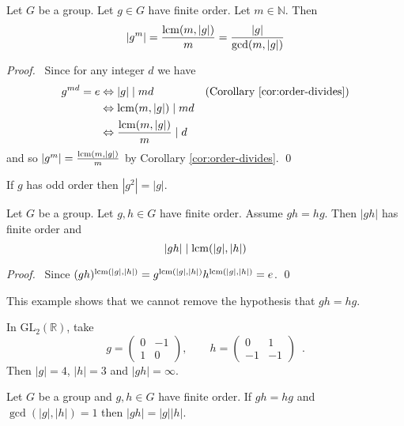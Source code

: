 \begin{prop}
\label{prop:order-of-g-to-the-m}
    Let $G$ be a group. Let $g \in G$ have finite order. Let $m \in \mathbb{N}$. Then
    \[ |g^m| = \frac{\operatorname{lcm}(m,|g|)}{m} = \frac{|g|}{\gcd(m,|g|)}\]
\end{prop}

\begin{proof}
    \pf\ Since for any integer $d$ we have
    \begin{align*}
        g^{md} = e & \Leftrightarrow |g| \mid md                  & (\text{Corollary \ref{cor:order-divides}}) \\
                   & \Leftrightarrow \operatorname{lcm}(m,|g|) \mid md                                                       \\
                   & \Leftrightarrow \frac{\operatorname{lcm}(m,|g|)}{m} \mid d & \relax
    \end{align*}
    and so $|g^m| = \frac{\operatorname{lcm}(m,|g|)}{m}$ by Corollary \ref{cor:order-divides}. \qed
\end{proof}

\begin{cor}
    If $g$ has odd order then $|g^2| = |g|$.
\end{cor}

\begin{prop}
    \label{prop:order-gh}
    Let $G$ be a group. Let $g,h \in G$ have finite order. Assume $gh = hg$. Then $|gh|$ has finite order and
    \[ |gh| \mid \operatorname{lcm}(|g|,|h|)\]
\end{prop}

\begin{proof}
    \pf\ Since $(gh)^{\operatorname{lcm}(|g|,|h|)} = g^{\operatorname{lcm}(|g|,|h|)}h^{\operatorname{lcm}(|g|,|h|)} = e$. \qed
\end{proof}

\begin{ex}
    This example shows that we cannot remove the hypothesis that $gh = hg$.

    In $\mathrm{GL}_2(\mathbb{R})$, take
    \[ g = \left( \begin{array}{cc} 0 & -1 \\ 1 & 0 \end{array} \right), \qquad
        h = \left( \begin{array}{cc} 0 & 1 \\ -1 & -1 \end{array} \right) \enspace . \]
    Then $|g| = 4$, $|h| = 3$ and $|gh| = \infty$.
\end{ex}

\begin{prop}
    \label{prop:order-gh-if-gcd-one}
    Let $G$ be a group and $g,h \in G$ have finite order. If $gh=hg$ and $\gcd(|g|,|h|) = 1$ then $|gh| = |g||h|$.
\end{prop}

